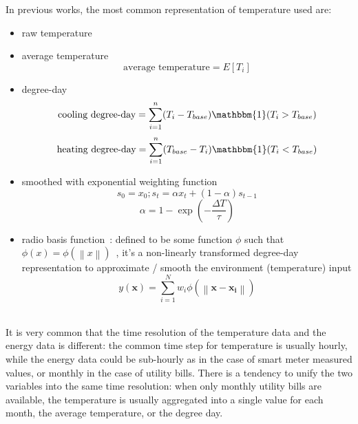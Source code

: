 \documentclass[12pt]{article}
\begin{document}
In previous works, the most common representation of temperature used are:
\begin{itemize}
\item raw temperature
\item average temperature
\begin{equation}
  \label{eq:ave_temp}
  \text{average temperature} = E[T_i]
\end{equation}
\item degree-day
\begin{equation}
  \label{eq:cool-degree-day}
  \text{cooling degree-day} = \sum_{i = 1}^n(T_i - T_{base})\mathbbm{1}(T_i > T_{base})
\end{equation}
\begin{equation}
  \label{eq:heat-degree-day}
  \text{heating degree-day} = \sum_{i = 1}^n(T_{base} - T_i)\mathbbm{1}(T_i < T_{base})
\end{equation}
\item smoothed with exponential weighting function~\cite{brown2012kernel, expSmoothWiki2016}
  \begin{equation}
    \label{eq:expsmooth}
    s_0 = x_0; s_t = \alpha x_t + (1 - \alpha)s_{t - 1}
  \end{equation}
  \begin{equation}
    \label{eq:timeconst}
    \alpha = 1 - \exp(-\frac{\Delta T}{\tau})
  \end{equation}
  \cite{expSmoothWiki2016}
\item radio basis function~\cite{wytock2013contextually}: defined to
  be some function $\phi$ such that
  $\phi(x) = \phi(\left\|x\right\|)$~\cite{rbfWiki2016}, it's a
  non-linearly transformed degree-day representation to approximate /
  smooth the environment (temperature) input
  \begin{equation}
    \label{eq:rbf_functionapprox}
    y(\mathbf{x}) = \sum_{i = 1}^N w_i \phi(\left\|\mathbf{x} - \mathbf{x_i}\right\|)
  \end{equation}~\cite{rbfWiki2016}
\end{itemize}

It is very common that the time resolution of the temperature data and
the energy data is different: the common time step for temperature is
usually hourly, while the energy data could be sub-hourly as in the
case of smart meter measured values, or monthly in the case of utility
bills. There is a tendency to unify the two variables into the same
time resolution: when only monthly utility bills are available, the
temperature is usually aggregated into a single value for each month,
the average temperature, or the degree day.
\end{document}
